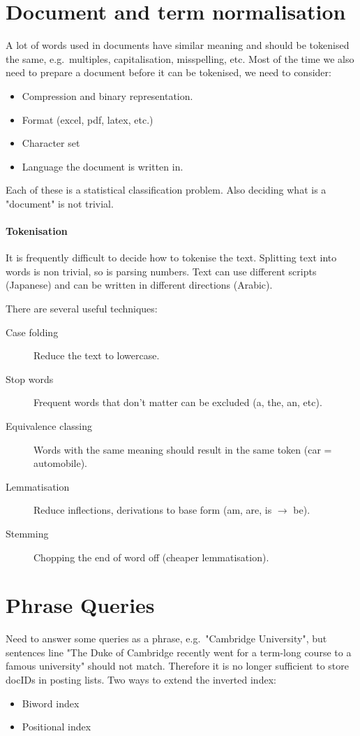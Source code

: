 \documentclass[a5paper]{report}
\begin{document}
\section{Document and term normalisation}
A lot of words used in documents have similar meaning and should be tokenised the same, e.g.\ multiples, capitalisation, misspelling, etc.
Most of the time we also need to prepare a document before it can be tokenised, we need to consider:
\begin{itemize}
\item Compression and binary representation.
\item Format (excel, pdf, latex, etc.)
\item Character set
\item Language the document is written in.
\end{itemize}
Each of these is a statistical classification problem.
Also deciding what is a "document" is not trivial.

\paragraph{Tokenisation} It is frequently difficult to decide how to tokenise the text.
Splitting text into words is non trivial, so is parsing numbers.
Text can use different scripts (Japanese) and can be written in different directions (Arabic).

There are several useful techniques:
\begin{description}
\item[Case folding] Reduce the text to lowercase.
\item[Stop words] Frequent words that don't matter can be excluded (a, the, an, etc).
\item[Equivalence classing] Words with the same meaning should result in the same token (car = automobile).
\item[Lemmatisation] Reduce inflections, derivations to base form (am, are, is $\rightarrow$ be).
\item[Stemming] Chopping the end of word off (cheaper lemmatisation).
\end{description}

\section{Phrase Queries}
Need to answer some queries as a phrase, e.g.\ "Cambridge University", but sentences line "The Duke of Cambridge recently went for a term-long course to a famous university" should not match.
Therefore it is no longer sufficient to store docIDs in posting lists.
Two ways to extend the inverted index:
\begin{itemize}
\item Biword index
\item Positional index
\end{itemize}
\end{document}
